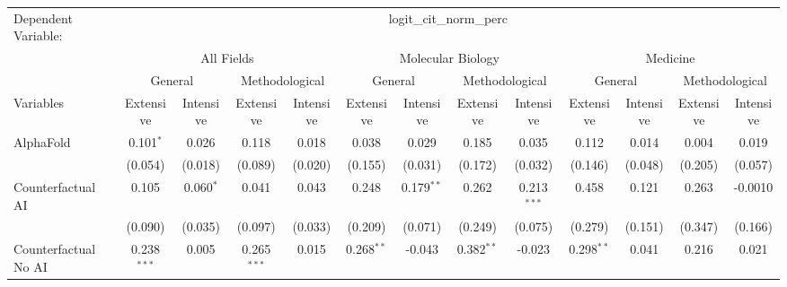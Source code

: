 \begingroup
\centering
\begin{tabular}{lcccccccccccc}
   \tabularnewline \midrule \midrule
   Dependent Variable: & \multicolumn{12}{c}{logit\_cit\_norm\_perc}\\
 & \multicolumn{4}{c}{All Fields} & \multicolumn{4}{c}{Molecular Biology} & \multicolumn{4}{c}{Medicine} \\
\cmidrule(lr){2-5} \cmidrule(lr){6-9} \cmidrule(lr){10-13}
 & \multicolumn{2}{c}{General} & \multicolumn{2}{c}{Methodological} & \multicolumn{2}{c}{General} & \multicolumn{2}{c}{Methodological} & \multicolumn{2}{c}{General} & \multicolumn{2}{c}{Methodological} \\
\cmidrule(lr){2-3} \cmidrule(lr){4-5} \cmidrule(lr){6-7} \cmidrule(lr){8-9} \cmidrule(lr){10-11} \cmidrule(lr){12-13}
Variables & \multicolumn{1}{c}{Extensive} & \multicolumn{1}{c}{Intensive} & \multicolumn{1}{c}{Extensive} & \multicolumn{1}{c}{Intensive} & \multicolumn{1}{c}{Extensive} & \multicolumn{1}{c}{Intensive} & \multicolumn{1}{c}{Extensive} & \multicolumn{1}{c}{Intensive} & \multicolumn{1}{c}{Extensive} & \multicolumn{1}{c}{Intensive} & \multicolumn{1}{c}{Extensive} & \multicolumn{1}{c}{Intensive} \\
\cmidrule(lr){1-1}\cmidrule(lr){2-2} \cmidrule(lr){3-3} \cmidrule(lr){4-4} \cmidrule(lr){5-5} \cmidrule(lr){6-6} \cmidrule(lr){7-7} \cmidrule(lr){8-8} \cmidrule(lr){9-9} \cmidrule(lr){10-10} \cmidrule(lr){11-11} \cmidrule(lr){12-12} \cmidrule(lr){13-13}
   AlphaFold                                & 0.101$^{*}$   & 0.026         & 0.118         & 0.018        & 0.038        & 0.029        & 0.185        & 0.035         & 0.112        & 0.014   & 0.004   & 0.019\\   
                                            & (0.054)       & (0.018)       & (0.089)       & (0.020)      & (0.155)      & (0.031)      & (0.172)      & (0.032)       & (0.146)      & (0.048) & (0.205) & (0.057)\\   
   Counterfactual AI                        & 0.105         & 0.060$^{*}$   & 0.041         & 0.043        & 0.248        & 0.179$^{**}$ & 0.262        & 0.213$^{***}$ & 0.458        & 0.121   & 0.263   & -0.0010\\   
                                            & (0.090)       & (0.035)       & (0.097)       & (0.033)      & (0.209)      & (0.071)      & (0.249)      & (0.075)       & (0.279)      & (0.151) & (0.347) & (0.166)\\   
   Counterfactual No AI                     & 0.238$^{***}$ & 0.005         & 0.265$^{***}$ & 0.015        & 0.268$^{**}$ & -0.043       & 0.382$^{**}$ & -0.023        & 0.298$^{**}$ & 0.041   & 0.216   & 0.021\\   

\end{tabular}
